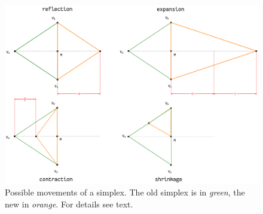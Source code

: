 \begin{refsection}
\begin{figure}
 \caption{Possible movements of a simplex. The old simplex is in \emph{green}, the new in \emph{orange}. For details see text. }
 \label{fig:SimMo}
 \centering
 \includegraphics[width=\textwidth]{Graphics/Simplex-moves}
\end{figure}


\end{refsection}

